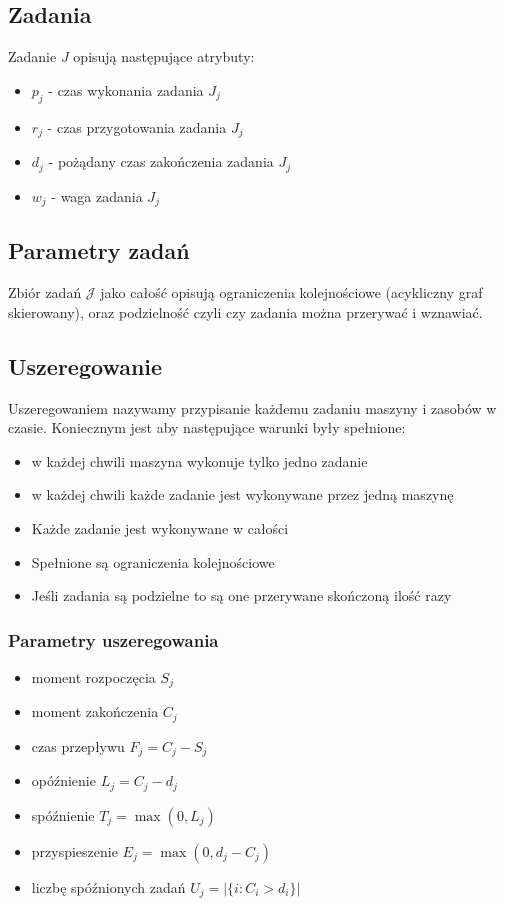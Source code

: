 \documentclass{../notatki}
\begin{document}
\subsection{Zadania}

Zadanie $J$ opisują następujące atrybuty:

\begin{itemize}
  \item $p_j$ - czas wykonania zadania $J_j$
  \item $r_j$ - czas przygotowania zadania $J_j$
  \item $d_j$ - pożądany czas zakończenia zadania $J_j$
  \item $w_j$ - waga zadania $J_j$
\end{itemize}

\subsection{Parametry zadań}

Zbiór zadań $\mathcal{J}$ jako całość opisują ograniczenia
kolejnościowe (acykliczny graf skierowany), oraz
podzielność czyli czy zadania można przerywać i wznawiać.

\subsection{Uszeregowanie}

Uszeregowaniem nazywamy przypisanie każdemu zadaniu maszyny i zasobów w czasie.
Koniecznym jest aby następujące warunki były spełnione:
\begin{itemize}
  \item w każdej chwili maszyna wykonuje tylko jedno zadanie
  \item w każdej chwili każde zadanie jest wykonywane przez jedną maszynę
  \item Każde zadanie jest wykonywane w całości
  \item Spełnione są ograniczenia kolejnościowe
  \item Jeśli zadania są podzielne to są one przerywane skończoną ilość razy
\end{itemize}

\subsubsection{Parametry uszeregowania}

\begin{itemize}
  \item moment rozpoczęcia $S_j$
  \item moment zakończenia $C_j$
  \item czas przepływu $F_j = C_j - S_j$
  \item opóźnienie $L_j = C_j - d_j$
  \item spóźnienie $T_j = \max(0, L_j)$
  \item przyspieszenie $E_j = \max(0, d_j - C_j)$
  \item liczbę spóźnionych zadań $U_j = |\{i : C_i > d_i\}|$
\end{itemize}
\end{document}
